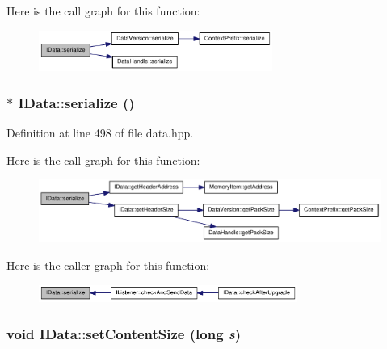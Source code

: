 Here is the call graph for this function:\nopagebreak
\begin{figure}[H]
\begin{center}
\leavevmode
\includegraphics[width=217pt]{class_i_data_a4c6b52cc869cd389399fd4d9ac9b3979_cgraph}
\end{center}
\end{figure}
\hypertarget{class_i_data_ac463fd8cadcd1d6ecd5955c25dbe9176}{
\subsubsection[{serialize}]{$\ast$ IData::serialize ()}}
\label{class_i_data_ac463fd8cadcd1d6ecd5955c25dbe9176}


Definition at line 498 of file data.hpp.

Here is the call graph for this function:\nopagebreak
\begin{figure}[H]
\begin{center}
\leavevmode
\includegraphics[width=317pt]{class_i_data_ac463fd8cadcd1d6ecd5955c25dbe9176_cgraph}
\end{center}
\end{figure}


Here is the caller graph for this function:\nopagebreak
\begin{figure}[H]
\begin{center}
\leavevmode
\includegraphics[width=240pt]{class_i_data_ac463fd8cadcd1d6ecd5955c25dbe9176_icgraph}
\end{center}
\end{figure}
\hypertarget{class_i_data_a640ef011d2cef11627d21ad5b6ab2cdb}{
\subsubsection[{setContentSize}]{\setlength{\rightskip}{0pt plus 5cm}void IData::setContentSize (long {\em s})}}
\label{class_i_data_a640ef011d2cef11627d21ad5b6ab2cdb}



